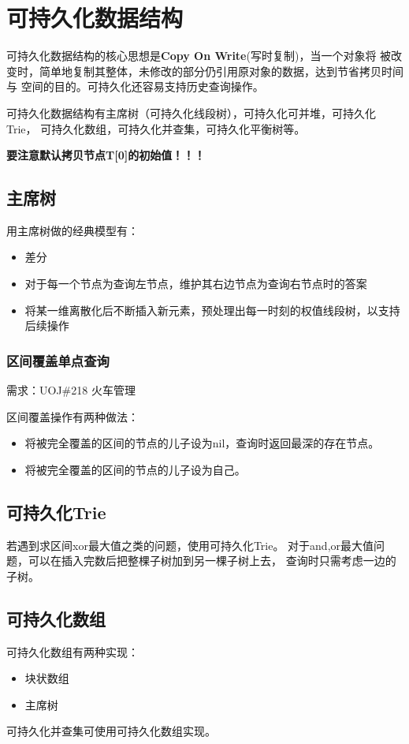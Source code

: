 \section{可持久化数据结构}
可持久化数据结构的核心思想是{\bfseries Copy On Write}(写时复制)，当一个对象将
被改变时，简单地复制其整体，未修改的部分仍引用原对象的数据，达到节省拷贝时间与
空间的目的。可持久化还容易支持历史查询操作。

可持久化数据结构有主席树（可持久化线段树），可持久化可并堆，可持久化Trie，
可持久化数组，可持久化并查集，可持久化平衡树等。

{\bfseries 要注意默认拷贝节点T[0]的初始值！！！}

\subsection{主席树}
用主席树做的经典模型有：
\begin{itemize}
    \item 差分
    \item 对于每一个节点为查询左节点，维护其右边节点为查询右节点时的答案
    \item 将某一维离散化后不断插入新元素，预处理出每一时刻的权值线段树，以支持后续操作
\end{itemize}

\subsubsection{区间覆盖单点查询}
需求：UOJ\#218 火车管理

区间覆盖操作有两种做法：
\begin{itemize}
    \item 将被完全覆盖的区间的节点的儿子设为nil，查询时返回最深的存在节点。
    \item 将被完全覆盖的区间的节点的儿子设为自己。
\end{itemize}
\subsection{可持久化Trie}
若遇到求区间xor最大值之类的问题，使用可持久化Trie。
对于and,or最大值问题，可以在插入完数后把整棵子树加到另一棵子树上去，
查询时只需考虑一边的子树。
\subsection{可持久化数组}
可持久化数组有两种实现：
\begin{itemize}
    \item 块状数组
    \item 主席树
\end{itemize}
可持久化并查集可使用可持久化数组实现。
